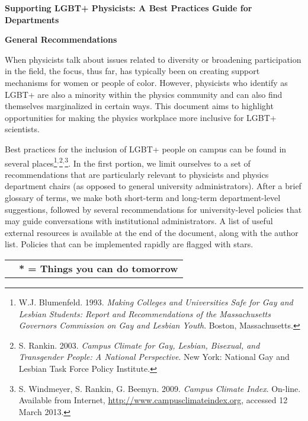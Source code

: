 \begin{titlepage}
\setcounter{page}{3}
\begin{center}

{\Large{\textbf{Supporting LGBT+ Physicists: A Best Practices Guide for Departments}}}
\vspace*{\baselineskip}

{\large{\textbf{General Recommendations}}}
\vspace*{\baselineskip}
\end{center}

When physicists talk about issues related to diversity or broadening participation in the field, the focus, thus far, has typically been on creating support mechanisms for women or people of color.  However, physicists who identify as LGBT+ are also a minority within the physics community and can also find themselves marginalized in certain ways.  This document aims to highlight opportunities for making the physics workplace more inclusive for LGBT+ scientists.\vspace*{\baselineskip}

Best practices for the inclusion of LGBT+ people on campus can be found in several places\footnote{W.J. Blumenfeld. 1993. \emph{Making Colleges and Universities Safe for Gay and Lesbian Students: Report and Recommendations of the Massachusetts Governors Commission on Gay and Lesbian Youth}. Boston, Massachusetts.}$^,$\footnote{S. Rankin. 2003. \emph{Campus Climate for Gay, Lesbian, Bisexual, and Transgender People: A National Perspective}. New York: National Gay and Lesbian Task Force Policy Institute.}$^,$\footnote{S. Windmeyer, S. Rankin, G. Beemyn. 2009. \emph{Campus Climate Index}. On-line. Available from Internet, \href{http://www.campusclimateindex.org}{http://www.campusclimateindex.org}, accessed 12 March 2013.}. In the first portion, we limit ourselves to a set of recommendations that are particularly relevant to physicists and physics department chairs (as opposed to general university administrators). After a brief glossary of terms, we make both short-term and long-term department-level suggestions, followed by several recommendations for university-level policies that may guide conversations with institutional administrators. A list of useful external resources is available at the end of the document, along with the author list. Policies that can be implemented rapidly are flagged with stars.\vspace*{\baselineskip}

\noindent\begin{tabular*}{\textwidth}{@{\extracolsep{\fill}}lr}
	 & \textbf{* = Things you can do tomorrow}
\end{tabular*}


\end{titlepage}